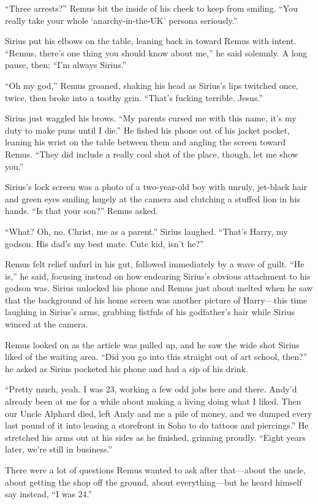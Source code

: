 “Three arrests?” Remus bit the inside of his cheek to keep from smiling. “You really take your whole ‘anarchy-in-the-UK’ persona seriously.”

Sirius put his elbows on the table, leaning back in toward Remus with intent. “Remus, there’s one thing you should know about me,” he said solemnly. A long pause, then; “I’m always Sirius.”

“Oh my god,” Remus groaned, shaking his head as Sirius’s lips twitched once, twice, then broke into a toothy grin. “That’s fucking terrible. Jesus.”

Sirius just waggled his brows. “My parents cursed me with this name, it’s my duty to make puns until I die.” He fished his phone out of his jacket pocket, leaning his wrist on the table between them and angling the screen toward Remus. “They did include a really cool shot of the place, though, let me show you.”

Sirius’s lock screen was a photo of a two-year-old boy with unruly, jet-black hair and green eyes smiling hugely at the camera and clutching a stuffed lion in his hands. “Is that your son?” Remus asked.

“What? Oh, no. Christ, me as a parent.” Sirius laughed. “That’s Harry, my godson. His dad’s my best mate. Cute kid, isn’t he?”

Remus felt relief unfurl in his gut, followed immediately by a wave of guilt. “He is,” he said, focusing instead on how endearing Sirius’s obvious attachment to his godson was. Sirius unlocked his phone and Remus just about melted when he saw that the background of his home screen was another picture of Harry—this time laughing in Sirius’s arms, grabbing fistfuls of his godfather’s hair while Sirius winced at the camera.

Remus looked on as the article was pulled up, and he saw the wide shot Sirius liked of the waiting area. “Did you go into this straight out of art school, then?” he asked as Sirius pocketed his phone and had a sip of his drink.

“Pretty much, yeah. I was 23, working a few odd jobs here and there. Andy’d already been at me for a while about making a living doing what I liked. Then our Uncle Alphard died, left Andy and me a pile of money, and we dumped every last pound of it into leasing a storefront in Soho to do tattoos and piercings.” He stretched his arms out at his sides as he finished, grinning proudly. “Eight years later, we’re still in business.”

There were a lot of questions Remus wanted to ask after that—about the uncle, about getting the shop off the ground, about everything—but he heard himself say instead, “I was 24.”

